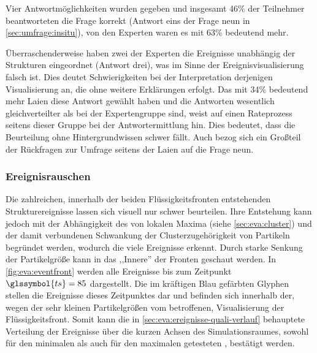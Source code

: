 Vier Antwortmöglichkeiten wurden gegeben und
insgesamt 46\% der Teilnehmer beantworteten die Frage korrekt (Antwort eins der Frage neun in \autoref{sec:umfrage:insitu}), von den Experten waren es mit 63\% bedeutend mehr.

Überraschenderweise haben zwei der Experten die Ereignisse unabhängig der Strukturen eingeordnet (Antwort drei), was im Sinne der Ereignisvisualisierung falsch ist. Dies deutet Schwierigkeiten bei der Interpretation derjenigen Visualisierung an, die ohne weitere Erklärungen erfolgt. Das mit 34\% bedeutend mehr Laien diese Antwort gewählt haben und die Antworten wesentlich gleichverteilter als bei der Expertengruppe sind, weist auf einen Rateprozess seitens dieser Gruppe bei der Antwortermittlung hin. Dies bedeutet, dass die Beurteilung ohne Hintergrundwissen schwer fällt. Auch bezog sich ein Großteil der Rückfragen zur Umfrage seitens der Laien auf die Frage neun.

\subsubsection*{Ereignisrauschen}\label{sec:ereignisrauschen}
Die zahlreichen, innerhalb der beiden Flüssigkeitsfronten entstehenden Strukturereignisse lassen sich visuell nur schwer beurteilen. Ihre Entstehung kann jedoch mit der Abhängigkeit des \CFD von lokalen Maxima (siehe \autoref{sec:eva:cluster}) und der damit verbundenen Schwankung der Clusterzugehörigkeit von Partikeln begründet werden, wodurch die  viele Ereignisse erkennt. Durch starke Senkung der Partikelgröße kann in das ,,Innere'' der Fronten geschaut werden. In \autoref{fig:eva:eventfront} werden alle Ereignisse bis zum Zeitpunkt $\glssymbol{ts} = 85$ dargestellt. Die im kräftigen Blau gefärbten Glyphen stellen die Ereignisse dieses Zeitpunktes dar und befinden sich innerhalb der, wegen der sehr kleinen Partikelgrößen vom  betroffenen, Visualisierung der Flüssigkeitsfront. Somit kann die in \autoref{sec:eva:ereignisse-quali-verlauf} behauptete Verteilung der Ereignisse über die kurzen Achsen des Simulationsraumes, sowohl für den minimalen als auch für den maximalen getesteten , bestätigt werden.

